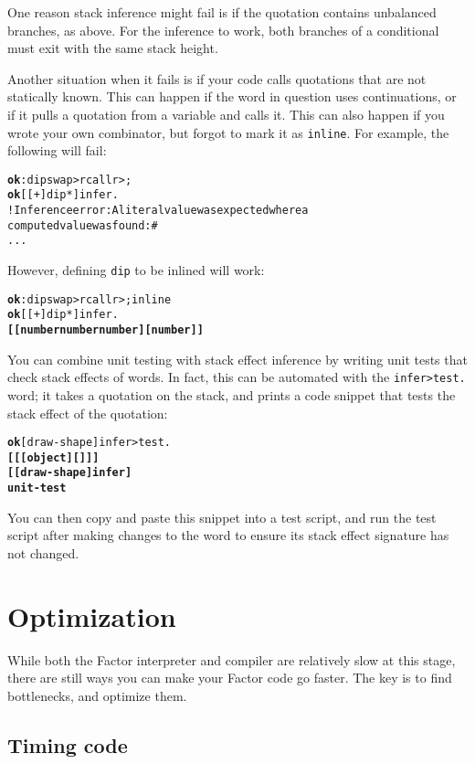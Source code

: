 \documentclass{book}
\begin{document}
One reason stack inference might fail is if the quotation contains unbalanced branches, as above. For the inference to work, both branches of a conditional must exit with the same stack height.

Another situation when it fails is if your code calls quotations that are not statically known. This can happen if the word in question uses continuations, or if it pulls a quotation from a variable and calls it. This can also happen if you wrote your own combinator, but forgot to mark it as \texttt{inline}. For example, the following will fail:

\begin{alltt}
\textbf{ok} : dip swap >r call r> ;
\textbf{ok} [ [ + ] dip * ] infer .
! Inference error: A literal value was expected where a
computed value was found: \#<computed @ 679711507>
...
\end{alltt}

However, defining \texttt{dip} to be inlined will work:

\begin{alltt}
\textbf{ok} : dip swap >r call r> ; inline
\textbf{ok} [ [ + ] dip * ] infer .
\textbf{[ [ number number number ] [ number ] ]}
\end{alltt}

You can combine unit testing with stack effect inference by writing unit tests that check stack effects of words. In fact, this can be automated with the \texttt{infer>test.} word; it takes a quotation on the stack, and prints a code snippet that tests the stack effect of the quotation:

\begin{alltt}
\textbf{ok} [ draw-shape ] infer>test.
\textbf{[ [ [ object ] [  ] ] ]
[ [ draw-shape ] infer ]
unit-test}
\end{alltt}

You can then copy and paste this snippet into a test script, and run the test script after
making changes to the word to ensure its stack effect signature has not changed.

\section{Optimization}

While both the Factor interpreter and compiler are relatively slow at this stage, there
are still ways you can make your Factor code go faster. The key is to find bottlenecks,
and optimize them.

\subsection{Timing code}
\end{document}

